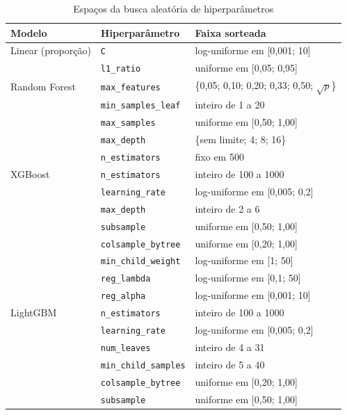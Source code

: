 \begin{table}[H]
    \centering
    \footnotesize
    \caption{Espaços da busca aleatória de hiperparâmetros}
    \begin{tabular}{L{3.4cm}L{4.0cm}L{6.6cm}}
        \toprule
        \textbf{Modelo} & \textbf{Hiperparâmetro} & \textbf{Faixa sorteada} \\
        \midrule
        Linear (proporção) & \texttt{C} & log-uniforme em [0,001; 10] \\
         & \texttt{l1\_ratio} & uniforme em [0,05; 0,95] \\
        \addlinespace
        Random Forest & \texttt{max\_features} & \{0,05; 0,10; 0,20; 0,33; 0,50; $\sqrt{p}$\} \\
         & \texttt{min\_samples\_leaf} & inteiro de 1 a 20 \\
         & \texttt{max\_samples} & uniforme em [0,50; 1,00] \\
         & \texttt{max\_depth} & \{sem limite; 4; 8; 16\} \\
         & \texttt{n\_estimators} & fixo em 500 \\
        \addlinespace
        XGBoost & \texttt{n\_estimators} & inteiro de 100 a 1000 \\
         & \texttt{learning\_rate} & log-uniforme em [0,005; 0,2] \\
         & \texttt{max\_depth} & inteiro de 2 a 6 \\
         & \texttt{subsample} & uniforme em [0,50; 1,00] \\
         & \texttt{colsample\_bytree} & uniforme em [0,20; 1,00] \\
         & \texttt{min\_child\_weight} & log-uniforme em [1; 50] \\
         & \texttt{reg\_lambda} & log-uniforme em [0,1; 50] \\
         & \texttt{reg\_alpha} & log-uniforme em [0,001; 10] \\
        \addlinespace
        LightGBM & \texttt{n\_estimators} & inteiro de 100 a 1000 \\
         & \texttt{learning\_rate} & log-uniforme em [0,005; 0,2] \\
         & \texttt{num\_leaves} & inteiro de 4 a 31 \\
         & \texttt{min\_child\_samples} & inteiro de 5 a 40 \\
         & \texttt{colsample\_bytree} & uniforme em [0,20; 1,00] \\
         & \texttt{subsample} & uniforme em [0,50; 1,00] \\

\end{tabular}
\end{table}
